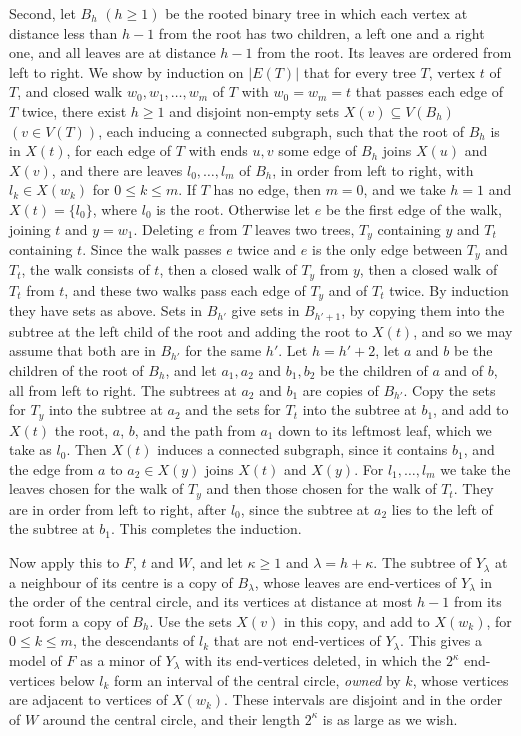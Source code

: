 {Second, let $B_h$ $(h \ge 1)$ be the rooted binary tree in which each vertex at distance less than $h - 1$ from the root has two children, a left one and a right one, and all leaves are at distance $h - 1$ from the root. Its leaves are ordered from left to right. We show by induction on $|E(T)|$ that for every tree $T$, vertex $t$ of $T$, and closed walk $w_0, w_1, \dots, w_m$ of $T$ with $w_0 = w_m = t$ that passes each edge of $T$ twice, there exist $h \ge 1$ and disjoint non-empty sets $X(v) \subseteq V(B_h)$ $(v \in V(T))$, each inducing a connected subgraph, such that the root of $B_h$ is in $X(t)$, for each edge of $T$ with ends $u, v$ some edge of $B_h$ joins $X(u)$ and $X(v)$, and there are leaves $l_0, \dots, l_m$ of $B_h$, in order from left to right, with $l_k \in X(w_k)$ for $0 \le k \le m$. If $T$ has no edge, then $m = 0$, and we take $h = 1$ and $X(t) = \{l_0\}$, where $l_0$ is the root. Otherwise let $e$ be the first edge of the walk, joining $t$ and $y = w_1$. Deleting $e$ from $T$ leaves two trees, $T_y$ containing $y$ and $T_t$ containing $t$. Since the walk passes $e$ twice and $e$ is the only edge between $T_y$ and $T_t$, the walk consists of $t$, then a closed walk of $T_y$ from $y$, then a closed walk of $T_t$ from $t$, and these two walks pass each edge of $T_y$ and of $T_t$ twice. By induction they have sets as above. Sets in $B_{h'}$ give sets in $B_{h' + 1}$, by copying them into the subtree at the left child of the root and adding the root to $X(t)$, and so we may assume that both are in $B_{h'}$ for the same $h'$. Let $h = h' + 2$, let $a$ and $b$ be the children of the root of $B_h$, and let $a_1, a_2$ and $b_1, b_2$ be the children of $a$ and of $b$, all from left to right. The subtrees at $a_2$ and $b_1$ are copies of $B_{h'}$. Copy the sets for $T_y$ into the subtree at $a_2$ and the sets for $T_t$ into the subtree at $b_1$, and add to $X(t)$ the root, $a$, $b$, and the path from $a_1$ down to its leftmost leaf, which we take as $l_0$. Then $X(t)$ induces a connected subgraph, since it contains $b_1$, and the edge from $a$ to $a_2 \in X(y)$ joins $X(t)$ and $X(y)$. For $l_1, \dots, l_m$ we take the leaves chosen for the walk of $T_y$ and then those chosen for the walk of $T_t$. They are in order from left to right, after $l_0$, since the subtree at $a_2$ lies to the left of the subtree at $b_1$. This completes the induction.

Now apply this to $F$, $t$ and $W$, and let $\kappa \ge 1$ and $\lambda = h + \kappa$. The subtree of $Y_\lambda$ at a neighbour of its centre is a copy of $B_\lambda$, whose leaves are end-vertices of $Y_\lambda$ in the order of the central circle, and its vertices at distance at most $h - 1$ from its root form a copy of $B_h$. Use the sets $X(v)$ in this copy, and add to $X(w_k)$, for $0 \le k \le m$, the descendants of $l_k$ that are not end-vertices of $Y_\lambda$. This gives a model of $F$ as a minor of $Y_\lambda$ with its end-vertices deleted, in which the $2^\kappa$ end-vertices below $l_k$ form an interval of the central circle, \textit{owned} by $k$, whose vertices are adjacent to vertices of $X(w_k)$. These intervals are disjoint and in the order of $W$ around the central circle, and their length $2^\kappa$ is as large as we wish.

}
